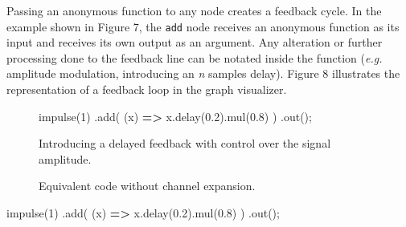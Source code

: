 \documentclass[11pt,]{article}
\newenvironment{Shaded}{}{}
\newcommand{\DecValTok}[1]{\textcolor[rgb]{0.25,0.63,0.44}{#1}}
\newcommand{\FloatTok}[1]{\textcolor[rgb]{0.25,0.63,0.44}{#1}}
\newcommand{\FunctionTok}[1]{\textcolor[rgb]{0.02,0.16,0.49}{#1}}
\newcommand{\KeywordTok}[1]{\textcolor[rgb]{0.00,0.44,0.13}{\textbf{#1}}}
\newcommand{\NormalTok}[1]{#1}
\newcommand{\OperatorTok}[1]{\textcolor[rgb]{0.40,0.40,0.40}{#1}}
\begin{document}
Passing an anonymous function to any node creates a feedback cycle. In
the example shown in Figure 7, the \texttt{add} node receives an
anonymous function as its input and receives its own output as an
argument. Any alteration or further processing done to the feedback line
can be notated inside the function (\emph{e.g.} amplitude modulation,
introducing an \emph{n} samples delay). Figure 8 illustrates the
representation of a feedback loop in the graph visualizer.

\vspace{0.5em}
\setcounter{figure}{6}    
\begin{figure}[h!]
    \centering
    \begin{minipage}{0.40\textwidth}
        \begin{Shaded}
        \begin{Highlighting}[]
        \FunctionTok{impulse}\NormalTok{(}\DecValTok{1}\NormalTok{)}
          \OperatorTok{.}\FunctionTok{add}\NormalTok{(}
        \NormalTok{    (x) }\KeywordTok{=\textgreater{}}\NormalTok{ x}\OperatorTok{.}\FunctionTok{delay}\NormalTok{(}\FloatTok{0.2}\NormalTok{)}\OperatorTok{.}\FunctionTok{mul}\NormalTok{(}\FloatTok{0.8}\NormalTok{)}
        \NormalTok{  )}
          \OperatorTok{.}\FunctionTok{out}\NormalTok{()}\OperatorTok{;}
        \end{Highlighting}
        \end{Shaded}
        \caption{Introducing a delayed feedback with control over the signal amplitude.}
    \end{minipage}\hspace{0.1\textwidth}
    \begin{minipage}{0.40\textwidth}
        \centering

        \caption{Equivalent code without channel expansion.}
    \end{minipage}
\end{figure}

\begin{Shaded}
\begin{Highlighting}[]
\FunctionTok{impulse}\NormalTok{(}\DecValTok{1}\NormalTok{)}
  \OperatorTok{.}\FunctionTok{add}\NormalTok{(}
\NormalTok{    (x) }\KeywordTok{=\textgreater{}}\NormalTok{ x}\OperatorTok{.}\FunctionTok{delay}\NormalTok{(}\FloatTok{0.2}\NormalTok{)}\OperatorTok{.}\FunctionTok{mul}\NormalTok{(}\FloatTok{0.8}\NormalTok{)}
\NormalTok{  )}
  \OperatorTok{.}\FunctionTok{out}\NormalTok{()}\OperatorTok{;}
\end{Highlighting}
\end{Shaded}
\end{document}
